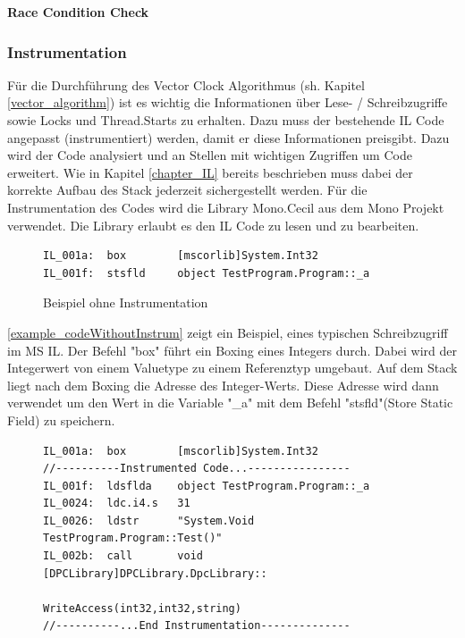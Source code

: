 \documentclass[10pt,a4paper]{article}
\begin{document}
\textbf{Race Condition Check}
\begin{flushleft}

\end{flushleft}
\subsubsection{Instrumentation}
\begin{flushleft}
Für die Durchführung des Vector Clock Algorithmus (sh. Kapitel \ref{vector_algorithm}) ist es wichtig die Informationen über Lese- / Schreibzugriffe sowie Locks und Thread.Starts zu erhalten. Dazu muss der bestehende IL Code angepasst (instrumentiert) werden, damit er diese Informationen preisgibt. Dazu wird der Code analysiert und an Stellen mit wichtigen Zugriffen um Code erweitert. Wie in Kapitel \ref{chapter_IL} bereits beschrieben muss dabei der korrekte Aufbau des Stack jederzeit sichergestellt werden. Für die Instrumentation des Codes wird die Library Mono.Cecil aus dem Mono Projekt verwendet. Die Library erlaubt es den IL Code zu lesen und zu bearbeiten. 
\begin{figure}[H]
\centering
\begin{lstlisting}[language=CIL,backgroundcolor=\color{backcolor}]
IL_001a:  box        [mscorlib]System.Int32
IL_001f:  stsfld     object TestProgram.Program::_a
\end{lstlisting}
\caption{Beispiel ohne Instrumentation}\label{example_codeWithoutInstrum}
\end{figure}
\autoref{example_codeWithoutInstrum} zeigt ein Beispiel, eines typischen Schreibzugriff im MS IL. Der Befehl "box" führt ein Boxing eines Integers durch. Dabei wird der Integerwert von einem Valuetype zu einem Referenztyp umgebaut. Auf dem Stack liegt nach dem Boxing die Adresse des Integer-Werts. Diese Adresse wird dann verwendet um den Wert in die Variable "\_a" mit dem Befehl "stsfld"(Store Static Field) zu speichern.\\
\begin{figure}[H]
\centering
\begin{lstlisting}[language=CIL,backgroundcolor=\color{backcolor}]
IL_001a:  box        [mscorlib]System.Int32
//----------Instrumented Code...----------------
IL_001f:  ldsflda    object TestProgram.Program::_a
IL_0024:  ldc.i4.s   31
IL_0026:  ldstr      "System.Void TestProgram.Program::Test()"
IL_002b:  call       void [DPCLibrary]DPCLibrary.DpcLibrary::
                                 WriteAccess(int32,int32,string)
//----------...End Instrumentation--------------

\end{lstlisting}
\end{figure}
\end{flushleft}
\end{document}
